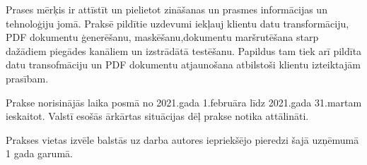 Prases mērķis ir attīstīt un pielietot zināšanas un prasmes informācijas un tehnoloģiju jomā.
Praksē pildītie uzdevumi iekļauj klientu datu transformāciju, PDF dokumentu ģenerēšanu, maskēšanu,dokumentu maršrutēšana starp dažādiem piegādes kanāliem un izstrādātā testēšanu. Papildus tam tiek arī pildīta datu transofmāciju un PDF dokumentu atjaunošana atbilstoši klientu izteiktajām prasībam.
\par Prakse norisinājās laika posmā no 2021.gada 1.februāra līdz 2021.gada 31.martam ieskaitot. Valstī esošās ārkārtas situācijas dēļ prakse notika attālināti.
\par Prakses vietas izvēle balstās uz darba autores iepriekšējo pieredzi šajā uzņēmumā 1 gada garumā.